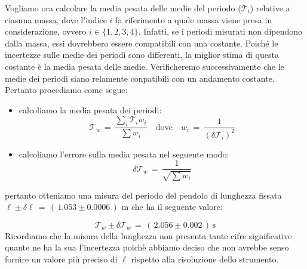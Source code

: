 Vogliamo ora calcolare la media pesata delle medie del periodo ($\mathcal{T}_i$) relative a ciasuna massa, dove l'indice $i$ fa riferimento a quale massa viene presa in considerazione, ovvero $i \in \{1,2,3,4\}$.
Infatti, se i periodi misurati non dipendono dalla massa, essi dovrebbero essere compatibili con una costante.
Poiché le incertezze sulle medie dei periodi sono differenti, la miglior stima di questa costante è la media pesata delle medie.
Verificheremo successivamente che le medie dei periodi siano relamente conpatibili con un andamento costante.
Pertanto procediamo come segue:

\begin{itemize}
	\item{calcoliamo la media pesata dei periodi:
			\begin{equation*}
				\mathcal{T}_w \,=\, \frac{\sum_i \mathcal{T}_i w_i}{\sum w_i} \quad \text{dove} \quad w_i \,=\, \frac{1}{(\delta \mathcal{T}_i)^2}
			\end{equation*}
			}
	\item{calcoliamo l'errore sulla media pesata nel seguente modo:
			\begin{equation*}
				\delta \mathcal{T}_w \,=\, \frac{1}{\sqrt{\sum w_i}}
			\end{equation*}
			}
\end{itemize}
pertanto otteniamo una misura del periodo del pendolo di lunghezza fissata $\ell \pm \delta \ell \,=\, (\,1.053 \pm 0.0006\,)$ m che ha il seguente valore:

\begin{equation*}
	\mathcal{T}_w \pm \delta \mathcal{T}_w \,=\, (\,2.056 \pm 0.002\,) \, \text{s}
\end{equation*}
%
Ricordiamo che la misura della lunghezza non presenta tante cifre significative quante ne ha la sua l'incertezza poichè abbiamo deciso che non avrebbe senso fornire un valore più preciso di $\ell$ rispetto alla risoluzione dello strumento.
